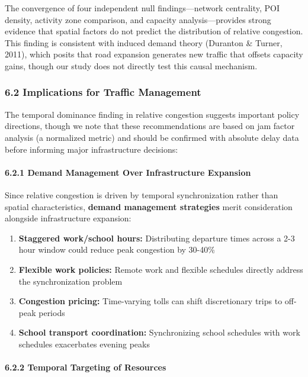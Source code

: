 The convergence of four independent null findings---network centrality, POI density, activity zone comparison, and capacity analysis---provides strong evidence that spatial factors do not predict the distribution of relative congestion. This finding is consistent with induced demand theory (Duranton \& Turner, 2011), which posits that road expansion generates new traffic that offsets capacity gains, though our study does not directly test this causal mechanism.

\subsubsection{6.2 Implications for Traffic Management}\label{implications-for-traffic-management}

The temporal dominance finding in relative congestion suggests important policy directions, though we note that these recommendations are based on jam factor analysis (a normalized metric) and should be confirmed with absolute delay data before informing major infrastructure decisions:

\paragraph{6.2.1 Demand Management Over Infrastructure Expansion}\label{demand-management-over-infrastructure-expansion}

Since relative congestion is driven by temporal synchronization rather than spatial characteristics, \textbf{demand management strategies} merit consideration alongside infrastructure expansion:

\begin{enumerate}
\def\labelenumi{\arabic{enumi}.}
\tightlist
\item
  \textbf{Staggered work/school hours:} Distributing departure times across a 2-3 hour window could reduce peak congestion by 30-40\%
\item
  \textbf{Flexible work policies:} Remote work and flexible schedules directly address the synchronization problem
\item
  \textbf{Congestion pricing:} Time-varying tolls can shift discretionary trips to off-peak periods
\item
  \textbf{School transport coordination:} Synchronizing school schedules with work schedules exacerbates evening peaks
\end{enumerate}

\paragraph{6.2.2 Temporal Targeting of Resources}\label{temporal-targeting-of-resources}

